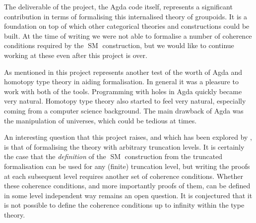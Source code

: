 \documentclass[12pt, parskip, DIV=14]{scrbook}
\newcommand{\SM}{\operatorname{SM}}
\begin{document}
The deliverable of the project, the Agda code itself, represents a significant contribution in terms of formalising this internalised theory of groupoids. It is a foundation on top of which other categorical theories and constructions could be built. At the time of writing we were not able to formalise a number of coherence conditions required by the $\SM$ construction, but we would like to continue working at these even after this project is over.

As mentioned in  this project represents another test of the worth of Agda and homotopy type theory in aiding formalisation. In general it was a pleasure to work with both of the tools. Programming with holes in Agda quickly became very natural. Homotopy type theory also started to feel very natural, especially coming from a computer science background. The main drawback of Agda was the manipulation of universes, which could be tedious at times.

An interesting question that this project raises, and which has been explored by \citet{kraus2014general}, is that of formalising the theory with arbitrary truncation levels. It is certainly the case that the \emph{definition} of the $\SM$ construction from the truncated formalisation can be used for any (finite) truncation level, but writing the proofs at each subsequent level requires another set of coherence conditions. Whether these coherence conditions, and more importantly proofs of them, can be defined in some level independent way remains an open question. It is conjectured that it is not possible to define the coherence conditions up to infinity within the type theory.

\newpage


\end{document}
